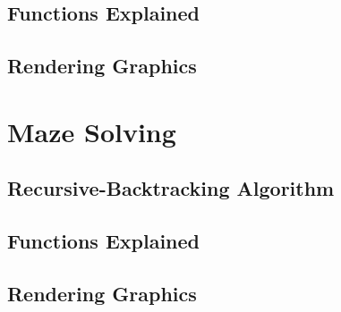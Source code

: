 \documentclass[11pt, margin=1in]{article}
\begin{document}
\subsection{Functions Explained} %

\subsection{Rendering Graphics} %


\section{Maze Solving} 

\subsection{Recursive-Backtracking Algorithm} %

\subsection{Functions Explained} %

\subsection{Rendering Graphics} %
\end{document}
